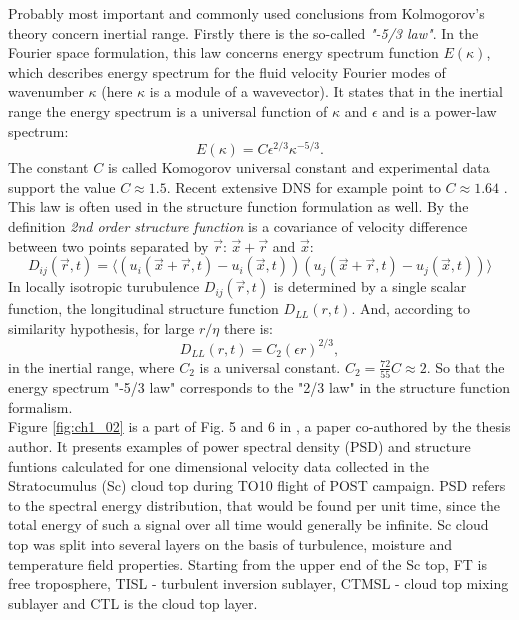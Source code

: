 \documentclass[../main.tex]{subfiles}
\begin{document}
Probably most important and commonly used conclusions from Kolmogorov's theory concern inertial range. Firstly there is the so-called \emph{"-5/3 law"}. In the Fourier space formulation, this law concerns energy spectrum function $E(\kappa)$, which describes energy spectrum for the fluid velocity  Fourier modes of wavenumber $\kappa$ (here $\kappa$ is a module of a wavevector). It states that in the inertial range the energy spectrum is a universal function of $\kappa$  and $\epsilon$ and is a power-law spectrum:
\begin{equation}
E(\kappa)=C \epsilon^{2/3} \kappa^{-5/3}.
\label{def:Ek_inertial}
\end{equation}
The constant $C$ is called Komogorov universal constant and experimental data support the value $C \approx 1.5$. Recent extensive DNS for example point to $C \approx 1.64$ \citet{Gotoh2002}. This law is often used in the structure function formulation as well. By the definition \emph{2nd order structure function} is a covariance of velocity difference between two points separated by $\vec{r}$: $\vec{x}+\vec{r}$ and $\vec{x}$:
\begin{equation}
D_{ij}(\vec{r},t)=\langle \left(u_i(\vec{x}+\vec{r},t)-u_i(\vec{x},t)\right)\left(u_j(\vec{x}+\vec{r},t)-u_j(\vec{x},t)\right)\rangle
\label{def:struct_fun}
\end{equation}
In locally isotropic turubulence $D_{ij}(\vec{r},t)$ is determined by a single scalar function, the longitudinal structure function $D_{LL}(r,t)$. And, according to similarity hypothesis, for large $r/\eta$ there is:
\begin{equation}
D_{LL}(r,t)=C_2 (\epsilon r)^{2/3},
\label{def:struct_fun_inertial}
\end{equation}
in the inertial range, where $C_2$ is a universal constant. $C_2 = \frac{72}{55} C \approx 2$. So that the energy spectrum "-5/3 law" corresponds to the "2/3 law" in the structure function formalism.\\
Figure \ref{fig:ch1_02} is a part of Fig. 5 and 6 in \citet{Jen-LaPlante2016}, a paper co-authored by the thesis author. It presents examples of power spectral density (PSD) and structure funtions calculated for one dimensional velocity data collected in the Stratocumulus (Sc) cloud top during TO10 flight of POST campaign. PSD refers to the spectral energy distribution, that would be found per unit time, since the total energy of such a signal over all time would generally be infinite. Sc cloud top was  split into several layers on the basis of turbulence, moisture and temperature field properties. Starting from the upper end of the Sc top, FT is free troposphere, TISL - turbulent inversion sublayer, CTMSL - cloud top mixing sublayer and CTL is the cloud top layer.\\
\end{document}
